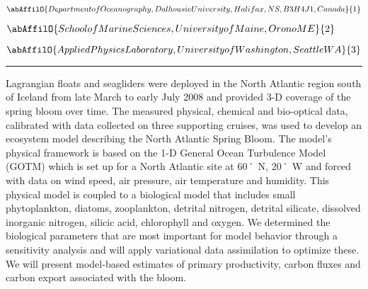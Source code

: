\begin{center}
   \vspace{2 mm} \begin{center}
    \vspace{2 mm}\begin{center}
  
  $\abAffilO{Department of Oceanography, Dalhousie University, Halifax, NS, B3H 4J1, Canada}{1}$

  
  $\abAffilO{School of Marine Sciences, University of Maine, Orono ME}{2}$

  
  $\abAffilO{Applied Physics Laboratory, University of Washington, Seattle WA}{3}$

  \end{center}
  \vspace{2 mm}
  \end{center}\end{center}
  \begin{center}\rule{0.70\linewidth}{0.5 pt}\end{center}

\noindent Lagrangian floats and seagliders were deployed in the North Atlantic region south of Iceland from late March to early July 2008 and provided 3-D coverage of the spring bloom over time. The measured physical, chemical and bio-optical data, calibrated with data collected on three supporting cruises, was used to develop an ecosystem model describing the North Atlantic Spring Bloom. The model’s physical framework is based on the 1-D General Ocean Turbulence Model (GOTM) which is set up for a North Atlantic site at 60˚ N, 20˚ W and forced with data on wind speed, air pressure, air temperature and humidity. This physical model is coupled to a biological model that includes small phytoplankton, diatoms, zooplankton, detrital nitrogen, detrital silicate, dissolved inorganic nitrogen, silicic acid, chlorophyll and oxygen. We determined the biological parameters that are most important for model behavior through a sensitivity analysis and will apply variational data assimilation to optimize these. We will present model-based estimates of primary productivity, carbon fluxes and carbon export associated with the bloom.

